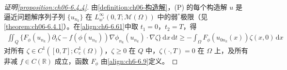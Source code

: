 \documentclass[../../main.tex]{subfiles}%
\begin{document}
\begin{proof}[证明\cref{proposition:ch06-6.4.4}]
由\cref{definition:ch06-构造解}，(P) 的每个构造解 $u$ 是逼近问题解序列子列 $\{u_{n_k}\}$ 在 $L^\infty_{w^*}(0,T;\mathscr{M}(\Omega))$ 中的弱$^*$极限（见\cref{theorem:ch06-6.4.1}）。在\eqref{align:ch6-6.61}中取 $t_1=0$，$t_2=T$，得
\begin{align}
\iint_Q\{F_\phi(u_{n_k})\partial_t\zeta-f(\phi(u_{n_k}))\nabla\phi_{n_k}(u_{n_k})\cdot\nabla\zeta\}\,\mathrm{d}x\,\mathrm{d}t
\geqslant-\int_\Omega F_\phi(u_{0n_k}(x))\zeta(x,0)\,\mathrm{d}x \label{align:ch6-6.126}
\end{align}
对所有 $\zeta\in C^1([0,T];C^1_c(\Omega))$，$\zeta\geqslant0$ 在 $Q$ 中，$\zeta(\cdot,T)=0$ 在 $\Omega$ 上，及所有非减 $f\in C(\mathbb{R})$ 成立，函数 $F_\phi$ 由\eqref{align:ch6-6.9}定义。


\end{proof}
\end{document}
